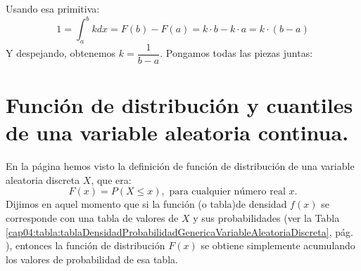 Usando esa primitiva:
\[
1=\int_a^b k dx=F(b)-F(a)=k\cdot b-k\cdot a=k\cdot(b-a)
\]
Y despejando, obtenemos $k=\dfrac{1}{b-a}$. Pongamos todas las piezas juntas:
    \begin{center}
    \end{center}


\section{Función de distribución y cuantiles de una variable aleatoria continua.}
\label{cap05:sec:FuncionDistribucionVariableContinua}

En la página \pageref{cap04:ecu:FuncionDistribucionVariableDiscreta} hemos visto la definición de función de distribución de una  variable aleatoria discreta $X$, que era:
\[F(x)=P(X\leq x),\mbox{ para cualquier número real }x.\]
Dijimos en aquel momento que si la función (o tabla)de densidad $f(x)$ se corresponde con una tabla de valores de $X$ y sus probabilidades (ver la Tabla \ref{cap04:tabla:tablaDensidadProbabilidadGenericaVariableAleatoriaDiscreta}, pág.
\pageref{cap04:tabla:tablaDensidadProbabilidadGenericaVariableAleatoriaDiscreta}), entonces la función de distribución $F(x)$ se obtiene simplemente acumulando los valores de probabilidad de esa tabla.

